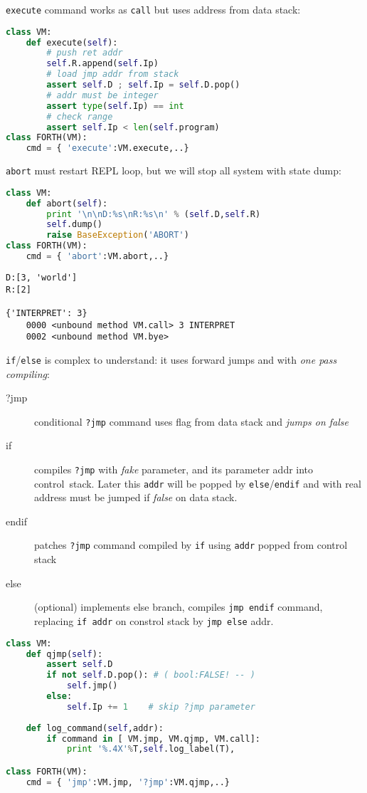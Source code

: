 \clearpage
\verb|execute| command works as \verb|call| but uses address from data stack:

\begin{lstlisting}[language=Python]
class VM:
	def execute(self):
		# push ret addr
		self.R.append(self.Ip)					
		# load jmp addr from stack
		assert self.D ; self.Ip = self.D.pop()	
		# addr must be integer
		assert type(self.Ip) == int				
		# check range
		assert self.Ip < len(self.program)		
class FORTH(VM):
	cmd = { 'execute':VM.execute,..} 
\end{lstlisting}

\clearpage
\verb|abort| must restart REPL loop, but we will stop all system with state
dump:
\begin{lstlisting}[language=Python]
class VM:
	def abort(self):
		print '\n\nD:%s\nR:%s\n' % (self.D,self.R)
		self.dump()
		raise BaseException('ABORT')
class FORTH(VM):
	cmd = { 'abort':VM.abort,..} 
\end{lstlisting}
\begin{lstlisting}
D:[3, 'world']
R:[2]

{'INTERPRET': 3}
	0000 <unbound method VM.call> 3 INTERPRET 
	0002 <unbound method VM.bye> 
\end{lstlisting}
		
\clearpage
\noindent
\verb|if|/\verb|else| is complex to understand: it uses forward jumps and
 with \emph{one pass compiling}:
\begin{description}
\item[?jmp] conditional \verb|?jmp| command uses flag from data stack and
\emph{jumps on false}
\item[if] compiles \verb|?jmp| with \emph{fake} parameter, and  its
parameter addr into control\ stack. Later this \verb|addr| will be popped by
\verb|else|/\verb|endif| and  with real address must be
jumped if \emph{false} on data stack.
\item[endif] patches \verb|?jmp| command compiled by \verb|if| using
\verb|addr| popped from control stack
\item[else] (optional) implements else branch, compiles \verb|jmp endif|
command, replacing \verb|if addr| on constrol stack by \verb|jmp else| addr.
\end{description}

\begin{lstlisting}[language=Python]
class VM:
	def qjmp(self):
		assert self.D
		if not self.D.pop(): # ( bool:FALSE! -- ) 
			self.jmp()
		else:
			self.Ip += 1	# skip ?jmp parameter
			
	def log_command(self,addr):
		if command in [ VM.jmp, VM.qjmp, VM.call]:
			print '%.4X'%T,self.log_label(T),

class FORTH(VM):
	cmd = { 'jmp':VM.jmp, '?jmp':VM.qjmp,..}
\end{lstlisting}

